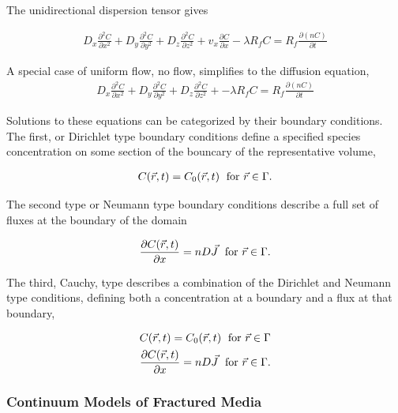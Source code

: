 The unidirectional dispersion tensor gives 

\begin{align}
  D_x \frac{\partial^2 C}{\partial x^2} +
  D_y \frac{\partial^2 C}{\partial y^2} +
  D_z \frac{\partial^2 C}{\partial z^2} +
  v_x \frac{\partial C}{\partial x} - \lambda R_f C = R_f 
  \frac{\partial(nC)}{\partial t} 
  \label{unidirflow}
\end{align}

A special case of uniform flow, no flow, simplifies to the diffusion equation,
\begin{align}
  D_x \frac{\partial^2 C}{\partial x^2} +
  D_y \frac{\partial^2 C}{\partial y^2} +
  D_z \frac{\partial^2 C}{\partial z^2} +
  - \lambda R_f C = R_f 
  \frac{\partial(nC)}{\partial t} 
  \label{diffusion}
\end{align}

Solutions to these equations can be categorized by their boundary conditions. 
The first, or Dirichlet type boundary conditions define a specified species 
concentration on some section of the bouncary of the representative volume, 

\begin{align*}
  C(\vec{r},t) = C_0(\vec{r},t)\hspace{1mm}\mbox{ for } \vec{r} \in \Gamma.
\end{align*}

The second type or Neumann type boundary conditions describe a full set of 
fluxes at  the boundary of the domain

\begin{align*}
  \frac{\partial C(\vec{r},t)}{\partial x} = nD\vec{J} \hspace{1mm}\mbox{ for } \vec{r} \in \Gamma.
\end{align*}

The third, Cauchy, type describes a combination of the Dirichlet and Neumann 
type conditions, defining both a concentration at a boundary and a flux at that 
boundary, 

\begin{align*}
  C(\vec{r},t) = C_0(\vec{r},t)\hspace{1mm}\mbox{ for } \vec{r} \in \Gamma\\
  \frac{\partial C(\vec{r},t)}{\partial x} = nD\vec{J} \hspace{1mm}\mbox{ for } \vec{r} \in \Gamma.
\end{align*}

\subsubsection{Continuum Models of Fractured Media} 

